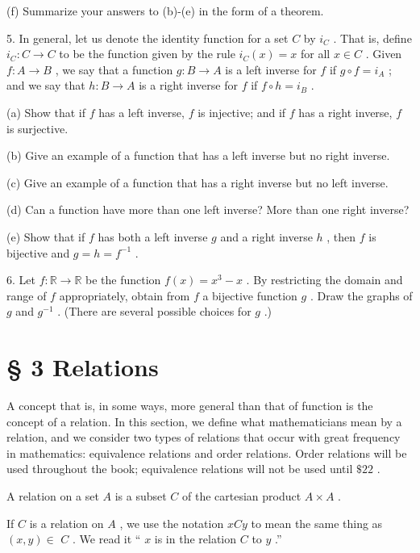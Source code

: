 (f) Summarize your answers to (b)-(e) in the form of a theorem.

5. In general, let us denote the identity function for a set \(C\) by \({i}_{C}\) . That is, define \({i}_{C} : C \rightarrow  C\) to be the function given by the rule \({i}_{C}\left( x\right)  = x\) for all \(x \in  C\) . Given \(f : A \rightarrow  B\) , we say that a function \(g : B \rightarrow  A\) is a left inverse for \(f\) if \(g \circ  f = {i}_{A}\) ; and we say that \(h : B \rightarrow  A\) is a right inverse for \(f\) if \(f \circ  h = {i}_{B}\) .

(a) Show that if \(f\) has a left inverse, \(f\) is injective; and if \(f\) has a right inverse, \(f\) is surjective.

(b) Give an example of a function that has a left inverse but no right inverse.

(c) Give an example of a function that has a right inverse but no left inverse.

(d) Can a function have more than one left inverse? More than one right inverse?

(e) Show that if \(f\) has both a left inverse \(g\) and a right inverse \(h\) , then \(f\) is bijective and \(g = h = {f}^{-1}\) .

6. Let \(f : \mathbb{R} \rightarrow  \mathbb{R}\) be the function \(f\left( x\right)  = {x}^{3} - x\) . By restricting the domain and range of \(f\) appropriately, obtain from \(f\) a bijective function \(g\) . Draw the graphs of \(g\) and \({g}^{-1}\) . (There are several possible choices for \(g\) .)

\section*{§ 3 Relations}

A concept that is, in some ways, more general than that of function is the concept of a relation. In this section, we define what mathematicians mean by a relation, and we consider two types of relations that occur with great frequency in mathematics: equivalence relations and order relations. Order relations will be used throughout the book; equivalence relations will not be used until \(\$ {22}\) .

\begin{definition} A relation on a set \(A\) is a subset \(C\) of the cartesian product \(A \times  A\) .
\end{definition}


If \(C\) is a relation on \(A\) , we use the notation \({xCy}\) to mean the same thing as \(\left( {x,y}\right)  \in\)  \(C\) . We read it `` \(x\) is in the relation \(C\) to \(y\) .''

